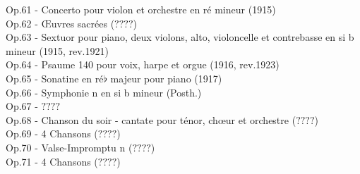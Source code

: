 Op.61 - Concerto pour violon et orchestre en ré mineur (1915)\\
Op.62 - Œuvres sacrées ($????$)\\
Op.63 - Sextuor pour piano, deux violons, alto, violoncelle et contrebasse en si b mineur (1915, rev.1921)\\
Op.64 - Psaume 140 pour voix, harpe et orgue (1916, rev.1923)\\
Op.65 - Sonatine en ré$\flat$ majeur pour piano (1917)\\
Op.66 - Symphonie n en si b mineur (Posth.)\\
Op.67 - $????$\\
Op.68 - Chanson du soir - cantate pour ténor, chœur et orchestre ($????$)\\
Op.69 - 4 Chansons ($????$)\\
Op.70 - Valse-Impromptu n ($????$)\\
Op.71 - 4 Chansons ($????$)
